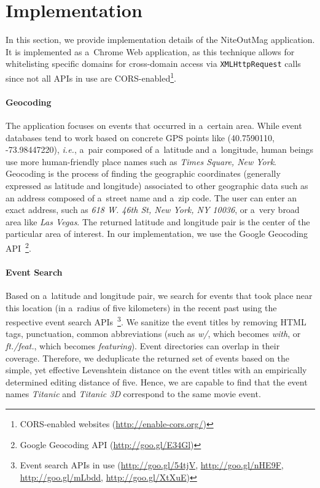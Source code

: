 \documentclass[runningheads,a4paper]{llncs}
\begin{document}
{%

\section{Implementation}                                                    \label{sec:implementation}
In this section, we provide implementation details of the NiteOutMag application. It is implemented as a~Chrome Web application, as this technique allows for whitelisting specific domains for cross-domain access via \texttt{XMLHttpRequest} calls since not all APIs in use are CORS-enabled\footnote{CORS-enabled websites (\url{http://enable-cors.org/})}.

\paragraph{Geocoding}
The application focuses on events that occurred in a~certain area. While event databases tend to work based on concrete GPS points like
(40.7590110, -73.98447220), \emph{i.e.}, a~pair composed of a~latitude and a~longitude, human beings use more human-friendly place names such as \emph{Times Square, New York}. Geocoding is the process of finding the geographic coordinates (generally expressed as latitude and longitude) associated to other geographic data such as an address composed of a~street name and a~zip code. The user can enter an exact address, such as \emph{618 W. 46th St, New York, NY 10036}, or a~very broad area like \emph{Las Vegas}. The returned latitude and longitude pair is the center of the particular area of interest. In our implementation, we use the Google Geocoding API~\footnote{Google Geocoding API (\url{http://goo.gl/E34Gl})}.

\paragraph{Event Search}
Based on a~latitude and longitude pair, we search for events that took place near this location (in a~radius of five kilometers) in the recent past using the respective event search APIs~\footnote{Event search APIs in use (\url{http://goo.gl/54tjV}, \url{http://goo.gl/nHE9F}, \url{http://goo.gl/mLbdd}, \url{http://goo.gl/XtXuE})}. We sanitize the event titles by removing HTML tags, punctuation,
common abbreviations (such as \emph{w/}, which becomes \emph{with}, or \emph{ft./feat.}, which becomes \emph{featuring}). Event directories can overlap in their coverage. Therefore, we deduplicate the returned set of events based on the simple, yet effective Levenshtein distance on the event titles with an empirically determined editing distance of five. Hence, we are capable to find that the event names \emph{Titanic} and \emph{Titanic 3D} correspond to the same movie event.

}
\end{document}

